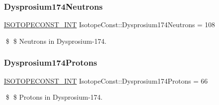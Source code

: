 \subsubsection{\texorpdfstring{Dysprosium174\+Neutrons}{Dysprosium174Neutrons}}
{\footnotesize\ttfamily \mbox{\hyperlink{group___isotope_const-_macros_ga5f18360b3e99483a35c32d789e62621c}{I\+S\+O\+T\+O\+P\+E\+C\+O\+N\+S\+T\+\_\+\+I\+NT}} Isotope\+Const\+::\+Dysprosium174\+Neutrons = 108}

\$ \$ Neutrons in Dysprosium-\/174. \mbox{\label{group___isotope_const-_dysprosium-_dy174_ga8ca5274d6fdfa70945053a25ed12f891}} 
\subsubsection{\texorpdfstring{Dysprosium174\+Protons}{Dysprosium174Protons}}
{\footnotesize\ttfamily \mbox{\hyperlink{group___isotope_const-_macros_ga5f18360b3e99483a35c32d789e62621c}{I\+S\+O\+T\+O\+P\+E\+C\+O\+N\+S\+T\+\_\+\+I\+NT}} Isotope\+Const\+::\+Dysprosium174\+Protons = 66}

\$ \$ Protons in Dysprosium-\/174. 